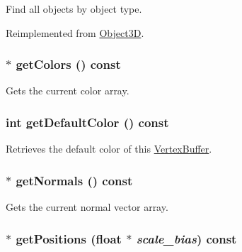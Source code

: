 Find all objects by object type. 

Reimplemented from \hyperlink{classm3g_1_1Object3D_4dadb21b568b0230fac106f15040138c}{Object3D}.\hypertarget{classm3g_1_1VertexBuffer_e3bdc8503242a6d278230352d03e5893}{
\subsubsection[{getColors}]{ $\ast$ getColors () const}}
\label{classm3g_1_1VertexBuffer_e3bdc8503242a6d278230352d03e5893}


Gets the current color array. \hypertarget{classm3g_1_1VertexBuffer_4e33b93a98ce0632d51e7ae775ae5b1e}{
\subsubsection[{getDefaultColor}]{\setlength{\rightskip}{0pt plus 5cm}int getDefaultColor () const}}
\label{classm3g_1_1VertexBuffer_4e33b93a98ce0632d51e7ae775ae5b1e}


Retrieves the default color of this \hyperlink{classm3g_1_1VertexBuffer}{VertexBuffer}. \hypertarget{classm3g_1_1VertexBuffer_0f4341d1215ff8f4efeaa40a21327c0c}{
\subsubsection[{getNormals}]{ $\ast$ getNormals () const}}
\label{classm3g_1_1VertexBuffer_0f4341d1215ff8f4efeaa40a21327c0c}


Gets the current normal vector array. \hypertarget{classm3g_1_1VertexBuffer_5ca059361f9f834dd00b5d595bf3df0b}{
\subsubsection[{getPositions}]{ $\ast$ getPositions (float $\ast$ {\em scale\_\-bias}) const}}
\label{classm3g_1_1VertexBuffer_5ca059361f9f834dd00b5d595bf3df0b}


